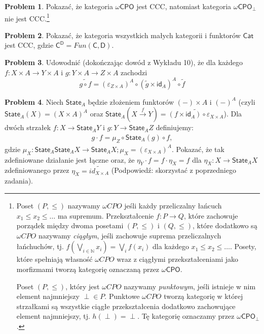 \documentclass[10pt]{amsart}
\theoremstyle{plain}
\theoremstyle{definition}
\newtheorem{problem}{Problem}
\numberwithin{equation}{section}
\begin{document}
\begin{problem}
Pokazać, że kategoria $\omega \mathsf{CPO}$ jest CCC, natomiast kategoria $\omega \mathsf{CPO}_\perp$ nie jest CCC.\footnote{Poset $(P,\leq)$ nazywamy $\omega CPO$ jeśli każdy przeliczalny łańcuch $x_1\leq x_2 \leq \dots$ ma supremum. Przekształcenie $f:P\to Q$, które zachowuje porządek między dwoma posetami $(P,\leq)$ i $(Q,\leq)$, które dodatkowo są $\omega CPO$ nazywamy \emph{ciągłym}, jeśli zachowuje suprema przeliczalnych łańchuchów, tj. $f(\bigvee_{i\in \mathbb{N}} x_i ) = \bigvee_{i} f(x_i)$ dla każdego $x_1\leq x_2\leq \ldots$. Posety, które spełniają własność $\omega CPO$ wraz z ciągłymi przekształceniami jako morfizmami tworzą kategorię oznaczaną przez $\omega\mathsf{CPO}$. 

Poset $(P,\leq)$, który jest $\omega CPO$ nazywamy \emph{punktowym}, jeśli istnieje w nim element najmniejszy $\perp\in P$. Punktowe $\omega CPO$ tworzą kategorię w której strzałkami są wszystkie ciągłe przekształcenia dodatkowo zachowujące element najmniejszy, tj. $h(\perp)= \perp$. Tę kategorię oznaczamy przez $\omega \mathsf{CPO}_\perp$.}  
\end{problem}


\begin{problem}
Pokazać, że kategoria wszystkich małych kategorii i funktorów $\mathsf{Cat}$ jest CCC, gdzie $\mathsf{C}^\mathsf{D} = Fun(\mathsf{C},\mathsf{D})$. 
\end{problem}

\begin{problem}
Udowodnić (dokończając dowód z Wykładu 10), że dla każdego $f:X\times A\to Y\times A$ i $g:Y\times A\to Z\times A$
zachodzi
$$
\widetilde{g\circ f} = (\varepsilon_{Z\times A})^A\circ (\widetilde{g}\times \mathsf{id}_A)^A\circ \widetilde{f}
$$
\end{problem}

\begin{problem}
Niech $\mathsf{State}_A$ będzie złożeniem funktorów $(-)\times A$ i $(-)^A$ (czyli $\mathsf{State}_A(X) = (X\times A)^A$ oraz
$\mathsf{State}_A(X\stackrel{f}{\to} Y) = \widetilde{ (f\times \mathsf{id}_A) \circ \varepsilon_{X\times A} }$). Dla dwóch strzałek $f:X\to \mathsf{State}_A Y$ i $g:Y\to \mathsf{State}_A Z$ definiujemy:
\begin{align}
g\cdot f = \mu_Z \circ \mathsf{State}_A (g) \circ f,\label{eq:composition}
\end{align}
gdzie $\mu_X:\mathsf{State}_A\mathsf{State}_A X \to \mathsf{State}_A X; \mu_X = (\varepsilon_{X\times A})^A$. Pokazać, że tak zdefiniowane działanie jest łączne oraz, że $\eta_Y \cdot f = f\cdot \eta_X = f$ dla $\eta_X:X\to \mathsf{State}_A X$ zdefiniowanego przez $\eta_X = \widetilde{id_{X\times A}}$ (Podpowiedź: skorzystać z poprzedniego zadania).
\end{problem}
\end{document}
